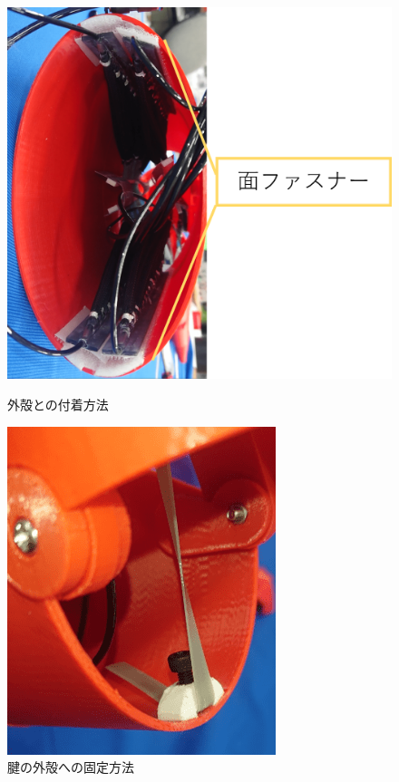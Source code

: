 \begin{figure}[t]
  \begin{minipage}{0.5\hsize}
    \centering
    \includegraphics[scale=0.09]{image/syusekikotei.png}
    \caption{外殻との付着方法}
    \label{fig:syusekikotei}
  \end{minipage}
  \begin{minipage}{0.5\hsize}
    \centering
    \includegraphics[scale=0.35]{image/kenkotei.png}
    \caption{腱の外殻への固定方法}
    \label{fig:kenkotei}
  \end{minipage}
\end{figure}
